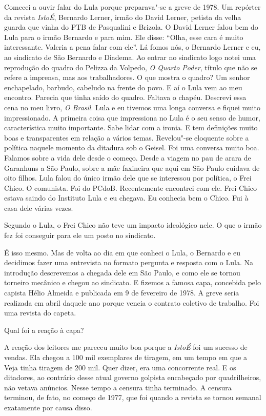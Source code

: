 \falaM Comecei a ouvir falar do Lula porque preparava"-se a greve de 1978. Um
repórter da revista \emph{IstoÉ}, Bernardo Lerner, irmão do David
Lerner, petista da velha guarda que vinha do PTB de Pasqualini e
Brizola. O David Lerner falou bem do Lula para o irmão Bernardo e para
mim. Ele disse: ``Olha, esse cara é muito interessante. Valeria a pena
falar com ele''. Lá fomos nós, o Bernardo Lerner e eu, ao sindicato de
São Bernardo e Diadema. Ao entrar no sindicato logo notei uma reprodução
do quadro do Pelizza da Volpedo, \emph{O Quarto Poder}, título que não
se refere a imprensa, mas aos trabalhadores. O que mostra o quadro? Um
senhor enchapelado, barbudo, cabeludo na frente do povo. E aí o Lula vem
ao meu encontro. Parecia que tinha saído do quadro. Faltava o chapéu.
Descrevi essa cena no meu livro, \emph{O Brasil}. Lula e eu tivemos uma
longa conversa e fiquei muito impressionado. A primeira coisa que
impressiona no Lula é o seu senso de humor, característica muito
importante. Sabe lidar com a ironia. E tem definições muito boas e
transparentes em relação a vários temas. Revelou"-se eloquente sobre a
política naquele momento da ditadura sob o Geisel. Foi uma conversa
muito boa. Falamos sobre a vida dele desde o começo. Desde a viagem no
pau de arara de Garanhuns a São Paulo, sobre a mãe faxineira que aqui em
São Paulo cuidava de oito filhos. Lula falou do único irmão dele que se
interessou por política, o Frei Chico. O comunista. Foi do PCdoB.
Recentemente encontrei com ele. Frei Chico estava saindo do Instituto
Lula e eu chegava. Eu conhecia bem o Chico. Fui à casa dele várias
vezes.

\falaG Segundo o Lula, o Frei Chico não teve um impacto ideológico nele. O
que o irmão fez foi conseguir para ele um posto no sindicato.

\falaM É isso mesmo. Mas de volta ao dia em que conheci o Lula, o Bernardo e
eu decidimos fazer uma entrevista no formato pergunta e resposta com o
Lula. Na introdução descrevemos a chegada dele em São Paulo, e como ele
se tornou torneiro mecânico e chegou ao sindicato. E fizemos a famosa
capa, concebida pelo capista Hélio Almeida e publicada em 9 de fevereiro
de 1978. A greve seria realizada em abril daquele ano porque vencia o
contrato coletivo de trabalho. Foi uma revista do capeta.

\falaG Qual foi a reação à capa?

\falaM A reação dos leitores me pareceu muito boa porque a \emph{IstoÉ} foi
um sucesso de vendas. Ela chegou a 100 mil exemplares de tiragem, em um
tempo em que a Veja tinha tiragem de 200 mil. Quer dizer, era uma
concorrente real. E os ditadores, ao contrário desse atual governo
golpista encabeçado por quadrilheiros, não vetava anúncios. Nesse tempo
a censura tinha terminado. A censura terminou, de fato, no começo de
1977, que foi quando a revista se tornou semanal exatamente por causa
disso.

